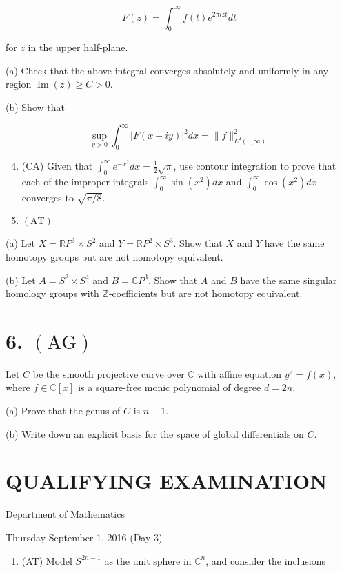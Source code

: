 \documentclass[10pt]{article}
\begin{document}
$$
F(z)=\int_{0}^{\infty} f(t) e^{2 \pi i z t} d t
$$

for $z$ in the upper half-plane.

(a) Check that the above integral converges absolutely and uniformly in any region $\operatorname{Im}(z) \geq C>0$.

(b) Show that

$$
\sup _{y>0} \int_{0}^{\infty}|F(x+i y)|^{2} d x=\|f\|_{L^{2}(0, \infty)}^{2}
$$

\begin{enumerate}
  \setcounter{enumi}{3}
  \item (CA) Given that $\int_{0}^{\infty} e^{-x^{2}} d x=\frac{1}{2} \sqrt{\pi}$, use contour integration to prove that each of the improper integrals $\int_{0}^{\infty} \sin \left(x^{2}\right) d x$ and $\int_{0}^{\infty} \cos \left(x^{2}\right) d x$ converges to $\sqrt{\pi / 8}$.

  \item $(\mathrm{AT})$

\end{enumerate}

(a) Let $X=\mathbb{R} P^{3} \times S^{2}$ and $Y=\mathbb{R} P^{2} \times S^{3}$. Show that $X$ and $Y$ have the same homotopy groups but are not homotopy equivalent.

(b) Let $A=S^{2} \times S^{4}$ and $B=\mathbb{C} P^{3}$. Show that $A$ and $B$ have the same singular homology groups with $\mathbb{Z}$-coefficients but are not homotopy equivalent.

\section{6. $(\mathrm{AG})$}
Let $C$ be the smooth projective curve over $\mathbb{C}$ with affine equation $y^{2}=f(x)$, where $f \in \mathbb{C}[x]$ is a square-free monic polynomial of degree $d=2 n$.

(a) Prove that the genus of $C$ is $n-1$.

(b) Write down an explicit basis for the space of global differentials on $C$.

\section*{QUALIFYING EXAMINATION }
Department of Mathematics

Thursday September 1, 2016 (Day 3)

\begin{enumerate}
  \item (AT) Model $S^{2 n-1}$ as the unit sphere in $\mathbb{C}^{n}$, and consider the inclusions
\end{enumerate}
\end{document}

